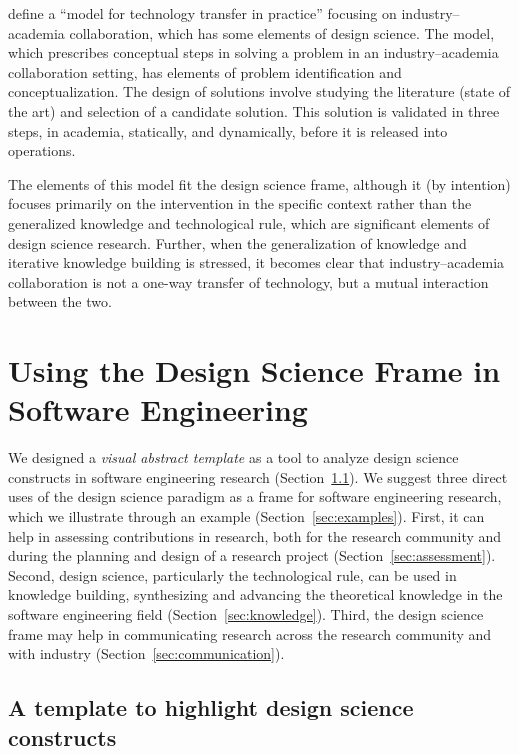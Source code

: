 \documentclass[graybox]{svmult}
\begin{document}
\cite{GorschekSW2006} define a ``model for technology transfer in practice'' focusing on industry--academia collaboration, which has some elements of design science. The model, which prescribes conceptual steps in solving a problem in an industry--academia collaboration setting, has elements of problem identification and conceptualization. The design of solutions involve studying the literature (state of the art) and selection of a candidate solution. This solution is validated in three steps, in academia, statically, and dynamically, before it is released into operations. 

The elements of this model fit the design science frame, although it (by intention) focuses primarily on the intervention in the specific context rather than the generalized knowledge and technological rule, which are significant elements of design science research. Further, when the generalization of knowledge and iterative knowledge building is stressed, it becomes clear that industry--academia collaboration is not a one-way transfer of technology, but a mutual interaction between the two.


\section{Using the Design Science Frame in Software Engineering}
\label{sec:UsingDSinSE}


 We designed a \emph{visual abstract template} as a tool to analyze design science constructs in software engineering research  (Section~\ref{sec:VA_template}). We suggest three direct uses of the design science paradigm as a frame for software engineering research, which we illustrate through an example (Section~\ref{sec:examples}). First, it can help in assessing contributions in research, both for the research community and during the planning and design of a research project (Section~\ref{sec:assessment}). Second, design science, particularly the technological rule, can be used in knowledge building, synthesizing and advancing the theoretical knowledge in the software engineering field (Section~\ref{sec:knowledge}). Third, the design science frame may help in communicating research across the research community and with industry (Section~\ref{sec:communication}). 


\subsection{A template to highlight design science constructs}%
\label{sec:VA_template}
\end{document}
